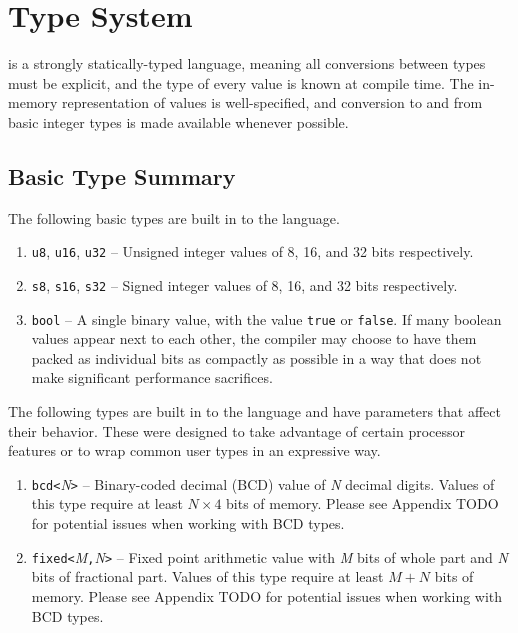 \section{Type System}

\gx{} is a strongly statically-typed language, meaning all conversions
between types must be explicit, and the type of every value is known at
compile time. The in-memory representation of values is well-specified,
and conversion to and from basic integer types is made available whenever
possible.

\subsection{Basic Type Summary}

The following basic types are built in to the language.

\begin{enumerate}

\item {\tt u8}, {\tt u16}, {\tt u32} -- Unsigned integer values
of 8, 16, and 32 bits respectively.

\item {\tt s8}, {\tt s16}, {\tt s32} -- Signed integer values of 8,
16, and 32 bits respectively.

\item {\tt bool} -- A single binary value, with the value {\tt true}
or {\tt false}. If many boolean values appear next to each other, the
compiler may choose to have them packed as individual bits as compactly as
possible in a way that does not make significant performance sacrifices.

\end{enumerate}

The following types are built in to the language and have parameters that
affect their behavior. These were designed to take advantage of certain
processor features or to wrap common user types in an expressive way.

\begin{enumerate}

\item {\tt bcd<}{\em N}{\tt >} -- Binary-coded decimal (BCD) value of
{\em N} decimal digits. Values of this type require at least $N \times
4$ bits of memory. Please see Appendix TODO for potential issues when
working with BCD types.

\item {\tt fixed<}{\em M}{\tt,}{\em N}{\tt >} -- Fixed point arithmetic
value with {\em M} bits of whole part and {\em N} bits of fractional
part. Values of this type require at least $M + N$ bits of memory. Please
see Appendix TODO for potential issues when working with BCD types.

\end{enumerate}

